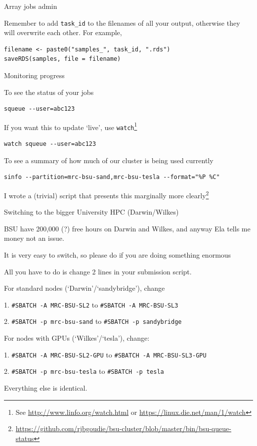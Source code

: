 \documentclass[t,10pt]{beamer}
\let\oldfootnote\footnote
\renewcommand\footnote[1][]{\oldfootnote[frame,#1]}
\begin{document}
\begin{frame}[fragile]{Array jobs admin}

Remember to add \texttt{task_id} to the filenames of all your output, otherwise they will overwrite each other. For example,

\begin{verbatim}
filename <- paste0("samples_", task_id, ".rds")
saveRDS(samples, file = filename)
\end{verbatim}

\end{frame}

\begin{frame}[fragile]{Monitoring progress}

To see the status of your jobs
\begin{verbatim}
squeue --user=abc123
\end{verbatim}

If you want this to update `live', use \texttt{watch}\footnote{See \url{http://www.linfo.org/watch.html} or \url{https://linux.die.net/man/1/watch}}
\begin{verbatim}
watch squeue --user=abc123
\end{verbatim}

To see a summary of how much of our cluster is being used currently
\begin{verbatim}
sinfo --partition=mrc-bsu-sand,mrc-bsu-tesla --format="%P %C"
\end{verbatim}
I wrote a (trivial) script that presents this marginally more clearly\footnote{\url{https://github.com/rjbgoudie/bsu-cluster/blob/master/bin/bsu-queue-status}}
\end{frame}

\begin{frame}[fragile]{Switching to the bigger University HPC (Darwin/Wilkes)}

BSU have 200,000 (?) free hours on Darwin and Wilkes, and anyway Ela tells me money not an issue.

\bigskip
It is very easy to switch, so please do if you are doing something enormous

\bigskip
All you have to do is change \alert{2 lines} in your submission script.

\bigskip
For standard nodes (`Darwin'/`sandybridge'), change

1. \texttt{#SBATCH -A MRC-BSU-SL2} to
\texttt{#SBATCH -A MRC-BSU-SL3}

2. \texttt{#SBATCH -p mrc-bsu-sand} to \texttt{#SBATCH -p sandybridge}

\bigskip
For nodes with GPUs (`Wilkes'/`tesla'), change:

1. \texttt{#SBATCH -A MRC-BSU-SL2-GPU} to
\texttt{#SBATCH -A MRC-BSU-SL3-GPU}

2. \texttt{#SBATCH -p mrc-bsu-tesla} to \texttt{#SBATCH -p tesla}

\bigskip
Everything else is identical.
\end{frame}
\end{document}
